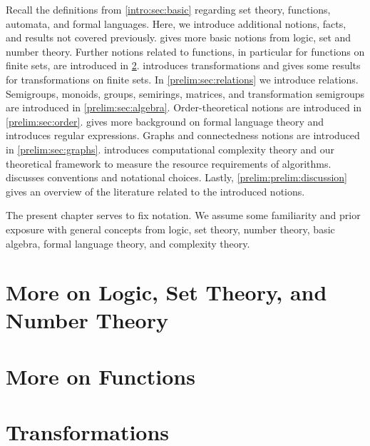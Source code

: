 
Recall the definitions from \cref{intro:sec:basic} regarding set theory, functions, automata, and formal languages. 
Here, we introduce additional notions, facts, and results not covered previously.
 gives more basic notions
from logic, set and number theory.
Further notions related to functions, in particular for functions on finite sets,
are introduced in \cref{prelim:sec:fun}.
 introduces transformations and gives some results
for transformations on finite sets.
In \cref{prelim:sec:relations} we introduce relations.
Semigroups, monoids, groups, semirings, matrices, and transformation semigroups
are introduced in \cref{prelim:sec:algebra}. Order-theoretical notions are introduced in \cref{prelim:sec:order}.
 gives more background on formal language theory
and introduces regular expressions.
Graphs and connectedness notions are introduced in \cref{prelim:sec:graphs}. 
 introduces computational complexity theory
and our theoretical framework to measure the resource requirements of algorithms.
discusses conventions and notational choices.
Lastly, \cref{prelim:prelim:discussion} 
gives an overview of the literature related to the introduced notions.

The present chapter serves to fix notation. We assume some familiarity and prior exposure
with general concepts from logic, set theory, number theory, basic algebra, formal language theory, and complexity theory.

\section{More on Logic, Set Theory, and Number Theory}
\label{sec:logic_set_theory_number_theory}



\section{More on Functions} 
\label{prelim:sec:fun}



\section{Transformations}
\label{pelim:sec:trans}

